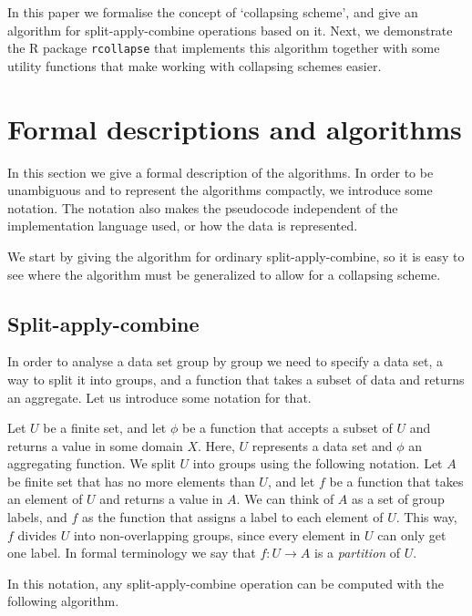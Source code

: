 \documentclass[11pt, fleqn]{article}
\begin{document}
In this paper we formalise the concept of `collapsing scheme', and give an
algorithm for split-apply-combine operations based on it. Next, we demonstrate
the R package \texttt{rcollapse} that implements this algorithm together with
some utility functions that make working with collapsing schemes easier.



\section{Formal descriptions and algorithms}
In this section we give a formal description of the algorithms. In order to be
unambiguous and to represent the algorithms compactly, we introduce some
notation. The notation also makes the pseudocode independent of the
implementation language used, or how the data is represented. 

We start by giving the algorithm for ordinary split-apply-combine, so it is
easy to see where the algorithm must be generalized to allow for a collapsing
scheme.


\subsection{Split-apply-combine}
In order to analyse a data set group by group we need to specify a data set, a
way to split it into groups, and a function that takes a subset of data and
returns an aggregate. Let us introduce some notation for that.

Let $U$ be a finite set, and let $\phi$ be a function that accepts a subset of
$U$ and returns a value in some domain $X$. Here, $U$ represents a data set and
$\phi$ an aggregating function. We split $U$ into groups using the following
notation. Let $A$ be finite set that has no more elements than $U$, and let $f$
be a function that takes an element of $U$ and returns a value in $A$. We can
think of $A$ as a set of group labels, and $f$ as the function that assigns a
label to each element of $U$. This way, $f$ divides $U$ into non-overlapping
groups, since every element in $U$ can only get one label.  In formal
terminology we say that $f:U\to A$ is a \emph{partition} of $U$.

In this notation, any split-apply-combine operation can be computed with the
following algorithm.
\end{document}
